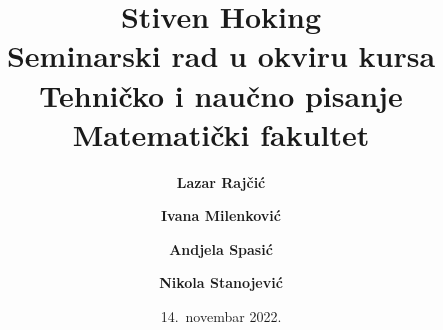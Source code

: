 \documentclass[a4paper, 12pt]{article}
\begin{document}
\title{\textbf{Stiven Hoking}\\ \small{Seminarski rad u okviru kursa\\Tehničko i naučno pisanje\\ Matematički fakultet}}

\author{
 \textbf {Lazar Rajčić}\\
  \and
  \textbf {Ivana Milenković}\\
  \and
 \textbf {Andjela Spasić}\\
  \and
 \textbf {Nikola Stanojević}\\
}
\date{14.~novembar 2022.}
\maketitle
\end{document}
